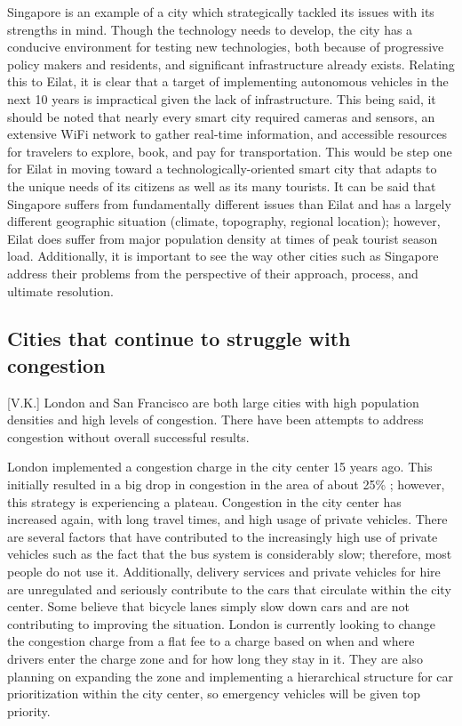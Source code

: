 \documentclass[12pt]{article}                       %
\begin{document}
Singapore is an example of a city which strategically tackled its issues with its strengths in mind. Though the technology needs to develop, the city has a conducive environment for testing new technologies, both because of progressive policy makers and residents, and significant infrastructure already exists. Relating this to Eilat, it is clear that a target of implementing autonomous vehicles in the next 10 years is impractical given the lack of infrastructure. This being said, it should be noted that nearly every smart city required cameras and sensors, an extensive WiFi network to gather real-time information, and accessible resources for travelers to explore, book, and pay for transportation. This would be step one for Eilat in moving toward a technologically-oriented smart city that adapts to the unique needs of its citizens as well as its many tourists. It can be said that Singapore suffers from fundamentally different issues than Eilat and has a largely different geographic situation (climate, topography, regional location); however, Eilat does suffer from major population density at times of peak tourist season load. Additionally, it is important to see the way other cities such as Singapore address their problems from the perspective of their approach, process, and ultimate resolution.

\subsection{Cities that continue to struggle with congestion}[V.K.]
London and San Francisco are both large cities with high population densities and high levels of congestion. There have been attempts to address congestion without overall successful results. 

London implemented a congestion charge in the city center 15 years ago. This initially resulted in a big drop in congestion in the area of about 25\% \cite{Badstuber2018LondonIt}; however, this strategy is experiencing a plateau. Congestion in the city center has increased again, with long travel times, and high usage of private vehicles. There are several factors that have contributed to the increasingly high use of private vehicles such as the fact that the bus system is considerably slow; therefore, most people do not use it. Additionally, delivery services and private vehicles for hire are unregulated and seriously contribute to the cars that circulate within the city center. Some believe that bicycle lanes simply slow down cars and are not contributing to improving the situation. London is currently looking to change the congestion charge from a flat fee to a charge based on when and where drivers enter the charge zone and for how long they stay in it. They are also planning on expanding the zone and implementing a hierarchical structure for car prioritization within the city center, so emergency vehicles will be given top priority. 
\end{document}
